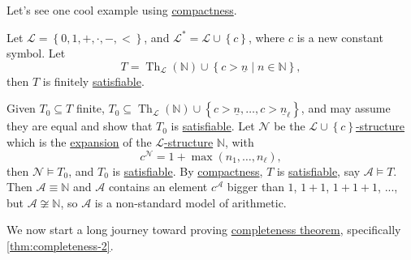 Let's see one cool example using \hyperref[thm:compactness]{compactness}.

\begin{eg}
	Let \(\mathcal{L} = \left\{ 0, 1, +, \cdot, -, < \right\} \), and \(\mathcal{L} ^{\ast} = \mathcal{L} \cup \left\{ c \right\} \), where \(c\) is a new constant symbol. Let
	\[
		T = \mathop{\mathrm{Th}}\nolimits_{\mathcal{L} }(\mathbb{N} ) \cup \left\{ c > \underline{n} \mid n \in \mathbb{N}  \right\} ,
	\]
	then \(T\) is finitely \hyperref[def:satisfiable]{satisfiable}.
\end{eg}
\begin{explanation}
	Given \(T_0 \subseteq T\) finite, \(T_0 \subseteq \mathop{\mathrm{Th}}\nolimits_{\mathcal{L} }(\mathbb{N} ) \cup \left\{ c> \underline{n}, \ldots , c>\underline{n}_{\ell }  \right\} \), and may assume they are equal and show that \(T_0\) is \hyperref[def:satisfiable]{satisfiable}. Let \(\mathcal{N} \) be the \hyperref[def:structure]{\(\mathcal{L} \cup \left\{ c \right\} \)-structure} which is the \hyperref[not:expansion]{expansion} of the \hyperref[def:structure]{\(\mathcal{L} \)-structure} \(\mathbb{N} \), with
	\[
		c^{\mathcal{N} }  = 1 + \max (n_1, \ldots , n_{\ell } ),
	\]
	then \(\mathcal{N} \models T_0\), and \(T_0\) is \hyperref[def:satisfiable]{satisfiable}. By \hyperref[thm:compactness]{compactness}, \(T\) is \hyperref[def:satisfiable]{satisfiable}, say \(\mathcal{A} \models T\). Then \(\mathcal{A} \equiv \mathbb{N} \) and \(\mathcal{A} \) contains an element \(c^{\mathcal{A} } \) bigger than \(1\), \(1+1\), \(1+1+1\), ..., but \(\mathcal{A} \not \cong \mathbb{N} \), so \(\mathcal{A} \) is a non-standard model of arithmetic.
\end{explanation}

We now start a long journey toward proving \hyperref[thm:completeness]{completeness theorem}, specifically \autoref{thm:completeness-2}.